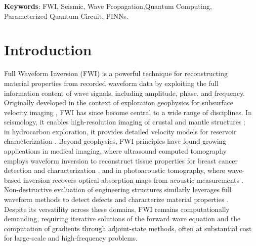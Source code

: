 \textbf{Keywords}: FWI, Seismic, Wave Propagation,Quantum Computing, Parameterized Quantum Circuit, PINNs. 



\section{Introduction}

Full Waveform Inversion (FWI) is a powerful technique for reconstructing material properties from recorded waveform data by exploiting the full information content of wave signals, including amplitude, phase, and frequency. Originally developed in the context of exploration geophysics for subsurface velocity imaging \parencite{Tarantola1984}, FWI has since become central to a wide range of disciplines. In seismology, it enables high-resolution imaging of crustal and mantle structures \parencite{Fichtner2009, Ebru2011}; in hydrocarbon exploration, it provides detailed velocity models for reservoir characterization \parencite{Virieux2009}. Beyond geophysics, FWI principles have found growing applications in medical imaging, where ultrasound computed tomography employs waveform inversion to reconstruct tissue properties for breast cancer detection and characterization \parencite{10.1121/1.3699240, Sandhu_2015}, and in photoacoustic tomography, where wave-based inversion recovers optical absorption maps from acoustic measurements \parencite{Wang2016}. Non-destructive evaluation of engineering structures similarly leverages full waveform methods to detect defects and characterize material properties \parencite{7422116}. Despite its versatility across these domains, FWI remains computationally demanding, requiring iterative solutions of the forward wave equation and the computation of gradients through adjoint-state methods, often at substantial cost for large-scale and high-frequency problems.



